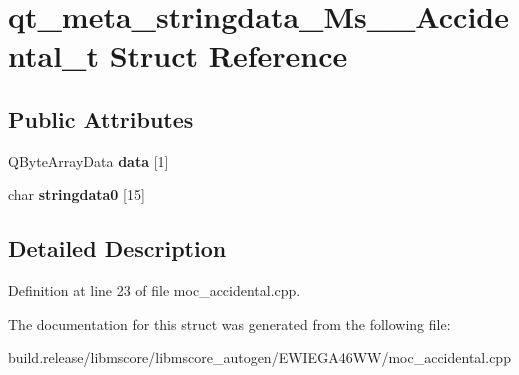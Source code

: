 \hypertarget{structqt__meta__stringdata___ms_____accidental__t}{}\section{qt\+\_\+meta\+\_\+stringdata\+\_\+\+Ms\+\_\+\+\_\+\+Accidental\+\_\+t Struct Reference}
\label{structqt__meta__stringdata___ms_____accidental__t}
\subsection*{Public Attributes}
\begin{DoxyCompactItemize}
\item 
\mbox{\label{structqt__meta__stringdata___ms_____accidental__t_ac7741ac94e14b033feb338c4c8f885e2}} 
Q\+Byte\+Array\+Data {\bfseries data} \mbox{[}1\mbox{]}
\item 
\mbox{\label{structqt__meta__stringdata___ms_____accidental__t_a142ab21c7d1a448eb75da27887ead5b9}} 
char {\bfseries stringdata0} \mbox{[}15\mbox{]}
\end{DoxyCompactItemize}


\subsection{Detailed Description}


Definition at line 23 of file moc\+\_\+accidental.\+cpp.



The documentation for this struct was generated from the following file\+:\begin{DoxyCompactItemize}
\item 
build.\+release/libmscore/libmscore\+\_\+autogen/\+E\+W\+I\+E\+G\+A46\+W\+W/moc\+\_\+accidental.\+cpp\end{DoxyCompactItemize}

